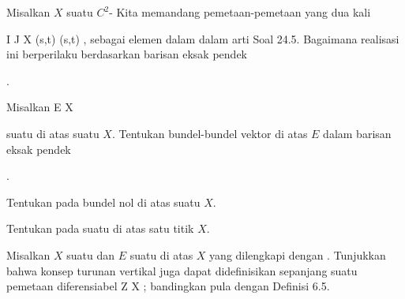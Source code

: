 {}
{

Misalkan $X$ suatu
$C^2$-
Kita memandang pemetaan-pemetaan yang dua kali

\maabbeledisp {\varphi} {I \times J} {X
} {(s,t)} { \varphi(s,t)
} {,}
sebagai elemen dalam
 dalam arti
Soal 24.5.
Bagaimana realisasi ini berperilaku berdasarkan barisan eksak pendek

 { . }

}
{} {}

{}
{

Misalkan
\maabb {} { E } { X
} {}

suatu
di atas suatu
$X$. Tentukan
bundel-bundel vektor di atas $E$ dalam barisan eksak pendek

 { . }

}
{} {}

{}
{

Tentukan
pada bundel nol di atas suatu
$X$.

}
{} {}

{}
{

Tentukan
pada suatu
di atas
satu titik $X$.

}
{} {}

{}
{

Misalkan $X$ suatu
dan $E$ suatu
di atas $X$ yang dilengkapi dengan
. Tunjukkan bahwa konsep turunan vertikal juga dapat didefinisikan sepanjang suatu pemetaan diferensiabel
\maabbdisp {\psi} { Z } { X
} {}
; bandingkan pula dengan
Definisi 6.5.

}
{} {}

